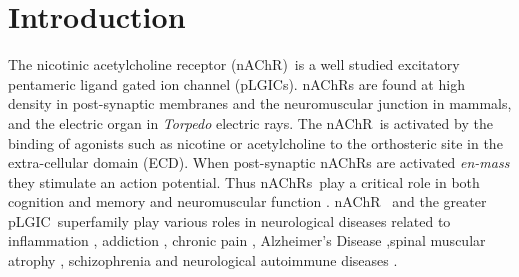 \documentclass[%
 aip,
 amsmath,amssymb,
 preprint,%
]{revtex4-1}\usepackage{setspace}
\newcommand{\nachr}{nAChR}
\newcommand{\plgic}{pLGIC}
\begin{document}


\linenumbers\relax %
\section{Introduction}
\label{Intro}

The nicotinic acetylcholine receptor (\nachr)~is a well studied excitatory pentameric ligand gated ion channel (\plgic s). \nachr s are found at high density in post-synaptic membranes and the neuromuscular junction in mammals, and the electric organ in \textit{Torpedo} electric rays. The \nachr~is activated by the binding of agonists such as nicotine or acetylcholine to the orthosteric site in the extra-cellular domain (ECD). When post-synaptic \nachr s are activated {\it en-mass} they stimulate an action potential. Thus \nachr s~play a critical role in both cognition and memory\cite{Henault2015} and neuromuscular function \cite{Mukhtasimova2016,Kalamida2007}. \nachr~ and the greater \plgic~superfamily play various roles in neurological diseases related to inflammation \cite{Taly2009,Patel2017,Yocum2017,Egea2015},  addiction \cite{Cornelison2016}, chronic pain \cite{Xiong2012}, Alzheimer's Disease \cite{Walstab2010,Picciotto_Neuroprotection_2008,MartinRuiz_4_1999,Kalamida2007},spinal muscular atrophy \cite{Arnold_Reduced_2004}, schizophrenia \cite{Haydar2010,Kalamida2007} and neurological autoimmune diseases \cite{Lennon_Immunization_2003, Kumari2008}.
\end{document}
